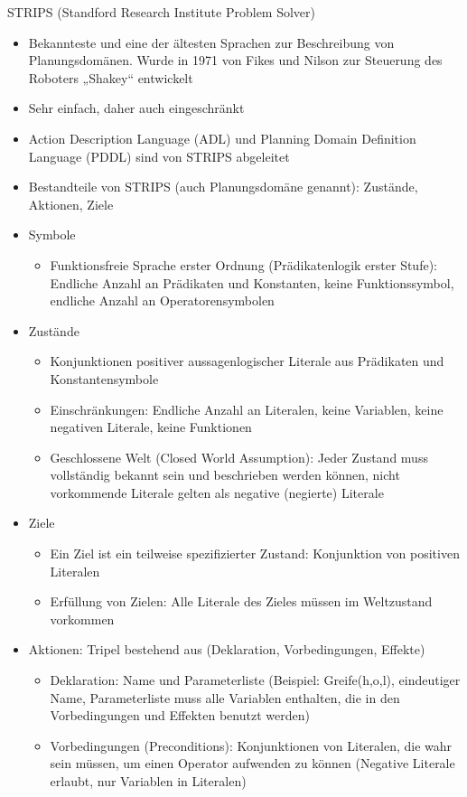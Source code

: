 \documentclass[paper=a4, fontsize=11pt]{scrartcl} %
\numberwithin{equation}{section} %
\numberwithin{figure}{section} %
\numberwithin{table}{section} %
\begin{document}
STRIPS (Standford Research Institute Problem Solver)
\begin{itemize}
\item Bekannteste und eine der ältesten Sprachen zur Beschreibung von Planungsdomänen. Wurde in 1971 von Fikes und Nilson zur Steuerung des Roboters „Shakey“ entwickelt
\item Sehr einfach, daher auch eingeschränkt
\item Action Description Language (ADL) und Planning Domain Definition Language (PDDL) sind von STRIPS abgeleitet
\item Bestandteile von STRIPS (auch Planungsdomäne genannt): Zustände, Aktionen, Ziele
\item Symbole
\begin{itemize}
\item Funktionsfreie Sprache erster Ordnung (Prädikatenlogik erster Stufe): Endliche Anzahl an Prädikaten und Konstanten, keine Funktionssymbol, endliche Anzahl an Operatorensymbolen
\end{itemize}
\item Zustände
\begin{itemize}
\item Konjunktionen positiver aussagenlogischer Literale aus Prädikaten und Konstantensymbole
\item Einschränkungen: Endliche Anzahl an Literalen, keine Variablen, keine negativen Literale, keine Funktionen
\item Geschlossene Welt (Closed World Assumption): Jeder Zustand muss vollständig bekannt sein und beschrieben werden können, nicht vorkommende Literale gelten als negative (negierte) Literale
\end{itemize}
\item Ziele
\begin{itemize}
\item Ein Ziel ist ein teilweise spezifizierter Zustand: Konjunktion von positiven Literalen
\item Erfüllung von Zielen: Alle Literale des Zieles müssen im Weltzustand vorkommen
\end{itemize}
\item Aktionen: Tripel bestehend aus (Deklaration, Vorbedingungen, Effekte)
\begin{itemize}
\item Deklaration: Name und Parameterliste (Beispiel: Greife(h,o,l), eindeutiger Name, Parameterliste muss alle Variablen enthalten, die in den Vorbedingungen und Effekten benutzt werden)
\item Vorbedingungen (Preconditions): Konjunktionen von Literalen, die wahr sein müssen, um einen Operator aufwenden zu können (Negative Literale erlaubt, nur Variablen in Literalen)

\end{itemize}
\end{itemize}
\end{document}

